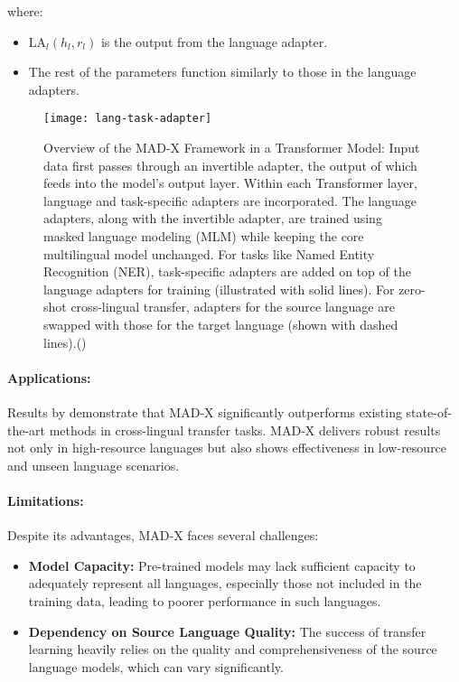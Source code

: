 where:
\begin{itemize}
	\item $\text{LA}_l(h_l, r_l)$ is the output from the language adapter.
	\item The rest of the parameters function similarly to those in the language adapters.
\end{itemize}

\begin{figure}[hbt]
	\centering
	\texttt{[image: lang-task-adapter]}
	\caption[Overview of the MAD-X Framework in a Transformer Model]{Overview of the MAD-X Framework in a Transformer Model: Input data first passes through an invertible adapter, the output of which feeds into the model's output layer. Within each Transformer layer, language and task-specific adapters are incorporated. The language adapters, along with the invertible adapter, are trained using masked language modeling (MLM) while keeping the core multilingual model unchanged. For tasks like Named Entity Recognition (NER), task-specific adapters are added on top of the language adapters for training (illustrated with solid lines). For zero-shot cross-lingual transfer, adapters for the source language are swapped with those for the target language (shown with dashed lines).(\citet{pfeiffer2020mad})}
	\label{fig: lang-task-adapter}
\end{figure}

\paragraph{Applications:} Results by \citet{pfeiffer2020mad} demonstrate that MAD-X significantly outperforms existing state-of-the-art methods in cross-lingual transfer tasks. MAD-X delivers robust results not only in high-resource languages but also shows effectiveness in low-resource and unseen language scenarios. 

\paragraph{Limitations:} Despite its advantages, MAD-X faces several challenges:
\begin{itemize}
	\item \textbf{Model Capacity:} Pre-trained models may lack sufficient capacity to adequately represent all languages, especially those not included in the training data, leading to poorer performance in such languages.
	\item \textbf{Dependency on Source Language Quality:} The success of transfer learning heavily relies on the quality and comprehensiveness of the source language models, which can vary significantly.
\end{itemize}

